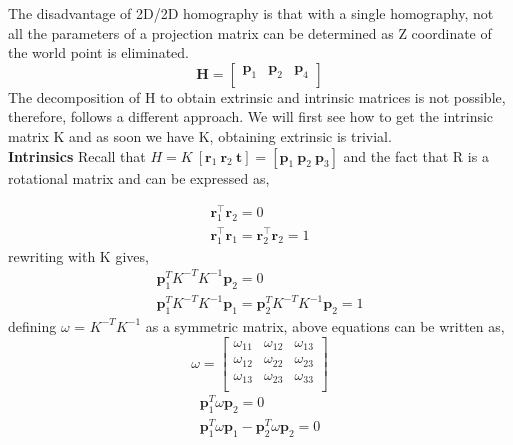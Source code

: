 The disadvantage of 2D/2D homography is that with a single homography, not all the parameters of a projection matrix can be determined as Z coordinate of the world point is eliminated.  
\begin{equation*}
\textbf{H} = \begin{bmatrix}
\textbf{p}_{1} & \textbf{p}_{2}  & \textbf{p}_{4} \\
\end{bmatrix}
\end{equation*} 
The decomposition of H to obtain extrinsic and intrinsic matrices is not possible, therefore, follows a different approach. We will first see how to get the intrinsic matrix K and as soon we have K, obtaining extrinsic is trivial.\\

\textbf{Intrinsics} Recall that $H = K\ [\textbf{r}_1\  \textbf{r}_2\  \textbf{t}] = [\textbf{p}_1\ \textbf{p}_2\ \textbf{p}_3]$ and the fact that R is a rotational matrix and can be expressed as,

\begin{equation*}
\begin{split}
\mathbf{r}_1^\intercal \mathbf{r}_2  = 0\\ 
\mathbf{r}_1^\intercal \mathbf{r}_1  = \mathbf{r}_2^\intercal \mathbf{r}_2  = 1 
\end{split}	
\end{equation*}
rewriting with K gives,
\begin{equation*}
\begin{split}
\mathbf{p}_1^T K^{-T} K^{-1} \mathbf{p}_2 = 0 \\
\mathbf{p}_1^T K^{-T} K^{-1} \mathbf{p}_1 = \mathbf{p}_2^T K^{-T} K^{-1} \mathbf{p}_2   = 1
\end{split}	
\end{equation*}
defining $\textbf{$\omega$}$ = $K^{-T} K^{-1}$ as a symmetric matrix, above equations can be written as,
\begin{equation*}
\omega = 
\begin{bmatrix}
\omega_{11} &\omega_{12}  &\omega_{13} \\
\omega_{12} &\omega_{22}  &\omega_{23} \\
\omega_{13} &\omega_{23}  &\omega_{33} \\
\end{bmatrix}
\end{equation*} 
\begin{equation}
\begin{split}
\mathbf{p}_1^T \omega \mathbf{p}_2 = 0 \\
\mathbf{p}_1^T \omega \mathbf{p}_1 - \mathbf{p}_2^T \omega \mathbf{p}_2  = 0
\end{split}	
\label{eq:intrinsic}
\end{equation}

